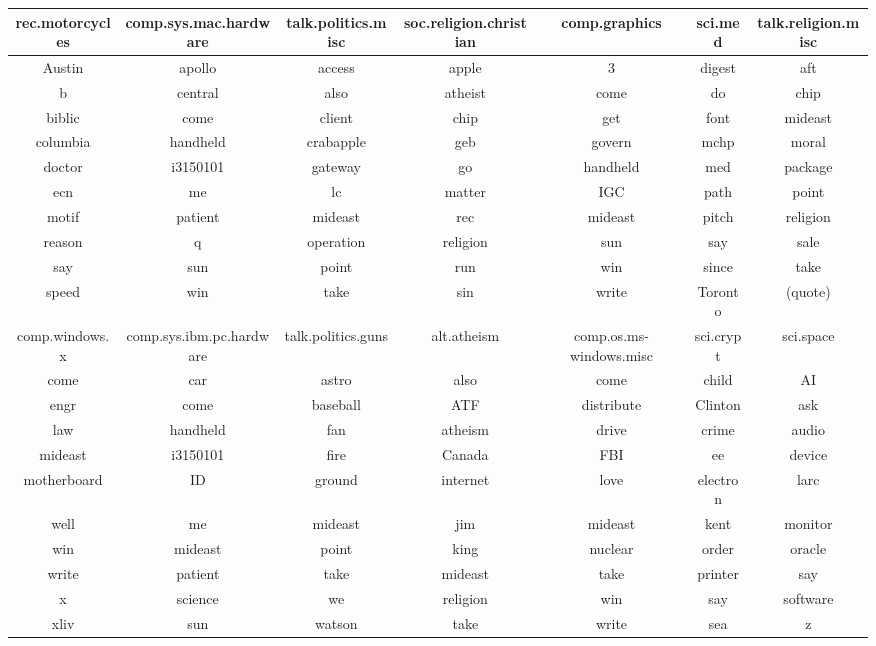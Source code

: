 \documentclass{article} %
\begin{document}
\begin{table}[htbp]
   \centering
   \tiny
   \begin{tabular}{@{}|c|c|c|c|c|c|c|@{}} %
   \hline
   rec.motorcycles & comp.sys.mac.hardware & talk.politics.misc & soc.religion.christian & comp.graphics & sci.med & talk.religion.misc\\ \hline \hline
      Austin   &  apollo& access & apple & 3 & digest &  aft\\
        b  &  central& also & atheist & come & do & chip \\
      biblic     &  come& client & chip & get & font & mideast \\
      columbia  & handheld & crabapple & geb & govern & mchp & moral \\
      doctor &  i3150101& gateway & go & handheld & med & package\\
      ecn &  me & lc & matter & IGC & path & point\\
      motif &  patient & mideast & rec & mideast & pitch & religion\\
      reason &  q& operation & religion & sun & say & sale\\
      say &  sun & point & run & win & since & take\\
      speed &  win & take & sin & write & Toronto & (quote) \\ \hline \hline
 comp.windows.x & comp.sys.ibm.pc.hardware & talk.politics.guns & alt.atheism & comp.os.ms-windows.misc & sci.crypt & sci.space\\ \hline \hline
      come & car & astro & also & come & child & AI\\
      engr & come & baseball & ATF & distribute & Clinton & ask\\
      law & handheld & fan & atheism & drive & crime & audio\\
      mideast & i3150101 & fire & Canada & FBI & ee & device\\
      motherboard & ID & ground & internet & love & electron & larc\\
      well & me & mideast & jim & mideast & kent & monitor\\
      win & mideast & point & king & nuclear & order & oracle\\
      write & patient & take & mideast & take & printer & say\\
      x & science & we & religion & win & say & software\\
      xliv & sun & watson & take & write & sea & z\\ \hline

\end{tabular}
\end{table}
\end{document}
